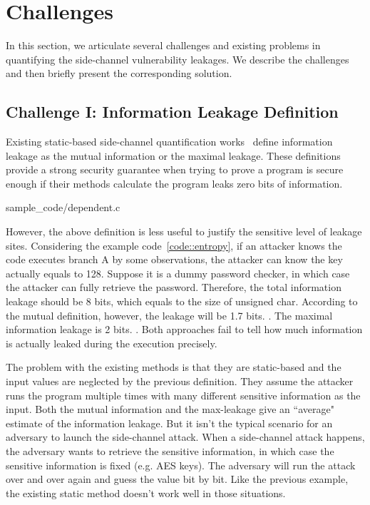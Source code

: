 \section{Challenges}

In this section, we articulate several challenges and existing problems
in quantifying the side-channel vulnerability leakages. We describe the
challenges and then briefly present the corresponding solution.

\subsection{Challenge I: Information Leakage Definition}

Existing static-based side-channel quantification works~\cite{182946} define information leakage
as the mutual information or the maximal leakage. These definitions provide a strong security guarantee
when trying to prove a program is secure enough if their methods calculate the program 
leaks zero bits of information.


{sample_code/dependent.c}

However, the above definition is less useful to justify the sensitive level of leakage sites. 
Considering the example code~\ref{code::entropy}, if an attacker knows the
code executes branch A by some observations, the attacker can know the key actually equals to 128. 
Suppose it is a dummy password checker, in which case the attacker can fully retrieve the password.
Therefore, the total information leakage should be 8 bits, which equals to the size
of unsigned char. 
According to the mutual definition, however, the leakage will be 1.7 bits. . The maximal information
leakage is 2 bits. . Both approaches fail to tell how much information is actually leaked during the execution precisely.

The problem with the existing methods is that they are static-based and the 
input values are neglected by the previous definition. 
They assume the attacker runs the program multiple times with many different sensitive 
information as the input. Both the mutual information and the max-leakage give an ``average" 
estimate of the information leakage. But it isn't the typical scenario for an adversary to 
launch the side-channel attack. When a side-channel attack happens, the adversary wants 
to retrieve the sensitive information, in which case the sensitive information is fixed (e.g. AES keys). 
The adversary will run the attack over and over again and guess the value bit by bit. Like the 
previous example, the existing static method doesn’t work well in those situations.

